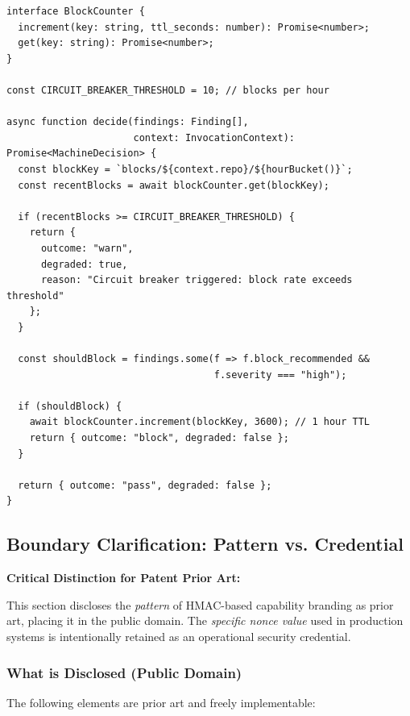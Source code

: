 \documentclass[11pt,a4paper]{article}
\begin{document}
\begin{verbatim}
interface BlockCounter {
  increment(key: string, ttl_seconds: number): Promise<number>;
  get(key: string): Promise<number>;
}

const CIRCUIT_BREAKER_THRESHOLD = 10; // blocks per hour

async function decide(findings: Finding[], 
                      context: InvocationContext): Promise<MachineDecision> {
  const blockKey = `blocks/${context.repo}/${hourBucket()}`;
  const recentBlocks = await blockCounter.get(blockKey);
  
  if (recentBlocks >= CIRCUIT_BREAKER_THRESHOLD) {
    return {
      outcome: "warn",
      degraded: true,
      reason: "Circuit breaker triggered: block rate exceeds threshold"
    };
  }
  
  const shouldBlock = findings.some(f => f.block_recommended && 
                                    f.severity === "high");
  
  if (shouldBlock) {
    await blockCounter.increment(blockKey, 3600); // 1 hour TTL
    return { outcome: "block", degraded: false };
  }
  
  return { outcome: "pass", degraded: false };
}
\end{verbatim}

\subsection{Boundary Clarification: Pattern vs. Credential}

\textbf{Critical Distinction for Patent Prior Art:}

This section discloses the \textit{pattern} of HMAC-based capability 
branding as prior art, placing it in the public domain. The \textit{specific 
nonce value} used in production systems is intentionally retained as an 
operational security credential.

\subsubsection{What is Disclosed (Public Domain)}

The following elements are prior art and freely implementable:
\end{document}
